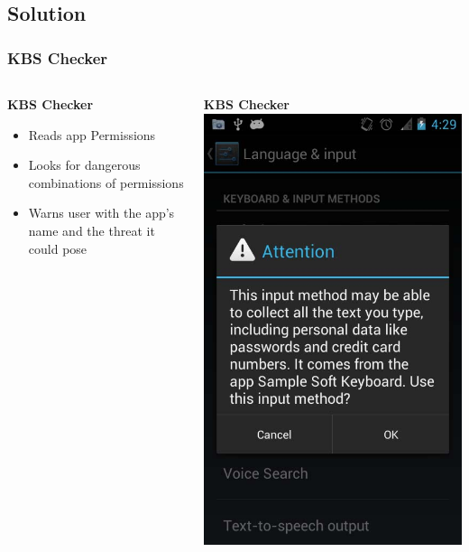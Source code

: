\documentclass{beamer}
\begin{document}
	\subsection{Solution}
		\begin{frame}
		\frametitle{KBS Checker}
		\begin{columns}[t]
		\begin{column}{.45\textwidth}
		\textbf{KBS Checker}
		\begin{itemize}
		\item Reads app Permissions
		\item Looks for dangerous combinations of permissions
		\item Warns user with the app's name and the threat it could pose
		\end{itemize}
		\end{column}
		\begin{column}{.45\textwidth}
			\textbf{KBS Checker}
			\includegraphics[width = \textwidth]{Images/KBSChecker.png} 

\end{column}
\end{columns}
\end{frame}
\end{document}

